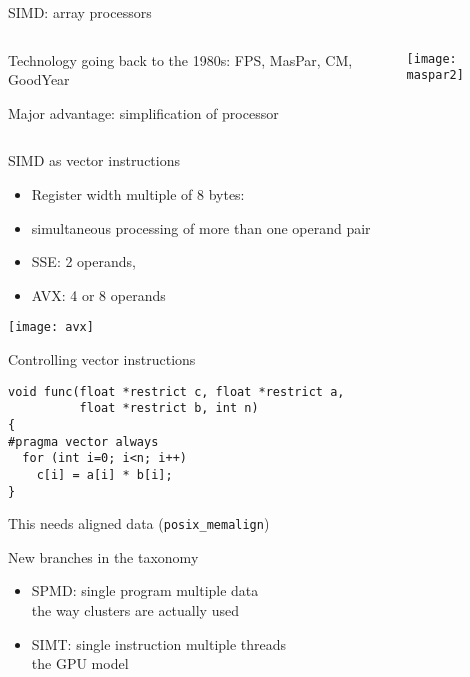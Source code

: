 \begin{numberedframe}{SIMD: array processors}
  \begin{columns}
    \begin{column}{.5\textwidth}
      Technology going back to the 1980s: FPS, MasPar, CM, GoodYear

      Major advantage: simplification of processor
    \end{column}
    \begin{column}{.5\textwidth}
      \texttt{[image: maspar2]}
    \end{column}
  \end{columns}
\end{numberedframe}

\begin{numberedframe}{SIMD as vector instructions}
  \begin{itemize}
  \item Register width multiple of 8 bytes:
  \item simultaneous processing of more than one operand pair
  \item SSE: 2 operands,
  \item AVX: 4 or 8 operands
  \end{itemize}
  \texttt{[image: avx]}
\end{numberedframe}

\begin{numberedframe}{Controlling vector instructions}
\begin{lstlisting}
void func(float *restrict c, float *restrict a,
          float *restrict b, int n)
{
#pragma vector always
  for (int i=0; i<n; i++)
    c[i] = a[i] * b[i];
}
\end{lstlisting}
This needs aligned data (\verb+posix_memalign+)
\end{numberedframe}

\begin{numberedframe}{New branches in the taxonomy}
  \begin{itemize}
  \item SPMD: single program multiple data\\
    the way clusters are actually used
  \item SIMT: single instruction multiple threads\\
    the GPU model
  \end{itemize}
\end{numberedframe}

